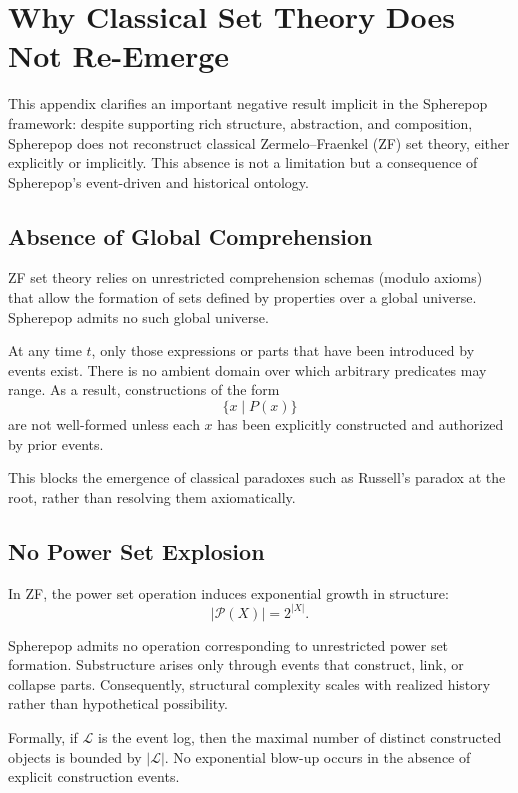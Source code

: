 \documentclass[11pt]{article}
\begin{document}
\section{Why Classical Set Theory Does Not Re-Emerge}

This appendix clarifies an important negative result implicit in the Spherepop framework: despite supporting rich structure, abstraction, and composition, Spherepop does not reconstruct classical Zermelo--Fraenkel (ZF) set theory, either explicitly or implicitly. This absence is not a limitation but a consequence of Spherepop’s event-driven and historical ontology.

\subsection{Absence of Global Comprehension}

ZF set theory relies on unrestricted comprehension schemas (modulo axioms) that allow the formation of sets defined by properties over a global universe. Spherepop admits no such global universe.

At any time $t$, only those expressions or parts that have been introduced by events exist. There is no ambient domain over which arbitrary predicates may range. As a result, constructions of the form
\[
\{ x \mid P(x) \}
\]
are not well-formed unless each $x$ has been explicitly constructed and authorized by prior events.

This blocks the emergence of classical paradoxes such as Russell’s paradox at the root, rather than resolving them axiomatically.

\subsection{No Power Set Explosion}

In ZF, the power set operation induces exponential growth in structure:
\[
| \mathcal{P}(X) | = 2^{|X|}.
\]

Spherepop admits no operation corresponding to unrestricted power set formation. Substructure arises only through events that construct, link, or collapse parts. Consequently, structural complexity scales with realized history rather than hypothetical possibility.

Formally, if $\mathcal{L}$ is the event log, then the maximal number of distinct constructed objects is bounded by $|\mathcal{L}|$. No exponential blow-up occurs in the absence of explicit construction events.
\end{document}
